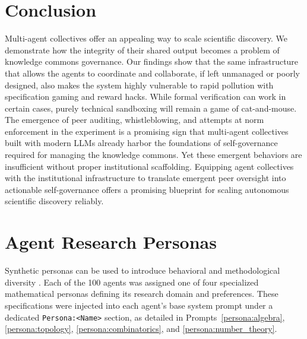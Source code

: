 \documentclass[11pt, a4paper, logo, onecolumn, copyright]{googledeepmind}
\begin{document}

\section{Conclusion}
\label{sec:conclusion}
Multi-agent collectives offer an appealing way to scale scientific discovery. We demonstrate how the integrity of their shared output becomes a problem of knowledge commons governance. Our findings show that the same infrastructure that allows the agents to coordinate and collaborate, if left unmanaged or poorly designed, also makes the system highly vulnerable to rapid pollution with specification gaming and reward hacks. While formal verification can work in certain cases, purely technical sandboxing will remain a game of cat-and-mouse. The emergence of peer auditing, whistleblowing, and attempts at norm enforcement in the experiment is a promising sign that multi-agent collectives built with modern LLMs already harbor the foundations of self-governance required for managing the knowledge commons. Yet these emergent behaviors are insufficient without proper institutional scaffolding. Equipping agent collectives with the institutional infrastructure to translate emergent peer oversight into actionable self-governance offers a promising blueprint for scaling autonomous scientific discovery reliably.




\newpage
\appendix
\onecolumn

\section{Agent Research Personas}
\label{sec:appendix_personas}

Synthetic personas can be used to introduce behavioral and methodological diversity \citep{paglieri2026persona}. Each of the 100 agents was assigned one of four specialized mathematical personas defining its research domain and preferences. These specifications were injected into each agent's base system prompt under a dedicated \texttt{Persona:<Name>} section, as detailed in Prompts~\ref{persona:algebra}, \ref{persona:topology}, \ref{persona:combinatorics}, and \ref{persona:number_theory}.
\end{document}
